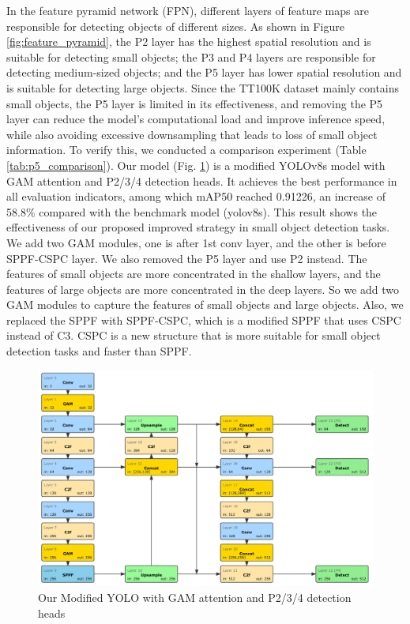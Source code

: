 \documentclass[10pt]{article}
\begin{document}
In the feature pyramid network (FPN), different layers of feature maps are responsible for detecting objects of different sizes. As shown in Figure \ref{fig:feature_pyramid}, the P2 layer has the highest spatial resolution and is suitable for detecting small objects; the P3 and P4 layers are responsible for detecting medium-sized objects; and the P5 layer has lower spatial resolution and is suitable for detecting large objects. Since the TT100K dataset mainly contains small objects, the P5 layer is limited in its effectiveness, and removing the P5 layer can reduce the model's computational load and improve inference speed, while also avoiding excessive downsampling that leads to loss of small object information. To verify this, we conducted a comparison experiment (Table \ref{tab:p5_comparison}).
Our model (Fig. \ref{fig:yolo—modified}) is a modified YOLOv8s model with GAM attention and P2/3/4 detection heads. It achieves the best performance in all evaluation indicators, among which mAP50 reached 0.91226, an increase of 58.8\% compared with the benchmark model (yolov8s). This result shows the effectiveness of our proposed improved strategy in small object detection tasks. We add two GAM modules, one is after 1st conv layer, and the other is before SPPF-CSPC layer. We also removed the P5 layer and use P2 instead. The features of small objects are more concentrated in the shallow layers, and the features of large objects are more concentrated in the deep layers. So we add two GAM modules to capture the features of small objects and large objects.
Also, we replaced the SPPF with SPPF-CSPC, which is a modified SPPF that uses CSPC instead of C3. CSPC is a new structure that is more suitable for small object detection tasks and faster than SPPF.

\begin{figure}[!h]
    \centering
    \includegraphics[width=\linewidth]{images/ours.png}
    \caption{Our Modified YOLO with GAM attention and P2/3/4 detection heads}
    \label{fig:yolo—modified}
    \end{figure}
\end{document}
